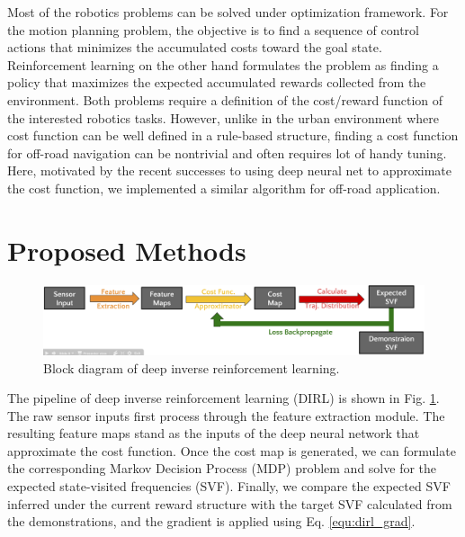 \documentclass[../thesis.tex]{subfiles}
\begin{document}

Most of the robotics problems can be solved under optimization framework. 
For the motion planning problem, the objective is to find a sequence of control actions that minimizes the accumulated costs toward the goal state. 
Reinforcement learning on the other hand formulates the problem as finding a policy that maximizes the expected accumulated rewards collected from the environment. 
Both problems require a definition of the cost/reward function of the interested robotics tasks.
However, unlike in the urban environment where cost function can be well defined in a rule-based structure, finding a cost function for off-road navigation can be nontrivial and often requires lot of handy tuning. \cite{silver2010learning}
Here, motivated by the recent successes \cite{wulfmeier2015maximum,wulfmeier2016watch} to using deep neural net to approximate the cost function, we implemented a similar algorithm for off-road application. 


\section{Proposed Methods}

\begin{figure}[t]
	\begin{center}
		\centerline{\includegraphics[width=\columnwidth]{./DIRL/fig/dirl_blockdiagram.png}}
		\caption{Block diagram of deep inverse reinforcement learning.}
		\label{fig:dirl_diagram}
	\end{center}
\end{figure} 

The pipeline of deep inverse reinforcement learning (DIRL) is shown in Fig. \ref{fig:dirl_diagram}. 
The raw sensor inputs first process through the feature extraction module. 
The resulting feature maps stand as the inputs of the deep neural network that approximate the cost function.
Once the cost map is generated, we can formulate the corresponding Markov Decision Process (MDP) problem and solve for the expected state-visited frequencies (SVF).
Finally, we compare the expected SVF inferred under the current reward structure with the target SVF calculated from the demonstrations, and the gradient is applied using Eq. \ref{equ:dirl_grad}. 
\end{document}
